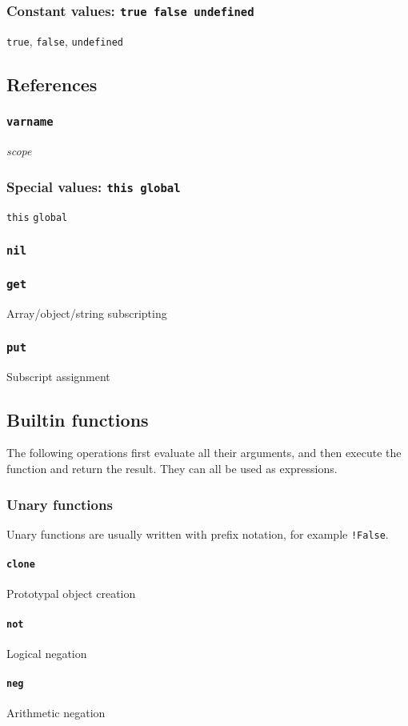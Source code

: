 \documentclass[10pt]{article}
\newcommand{\n}[1]{{\tt #1}}
\newcommand{\p}[1]{{\em #1}}
\begin{document}
\subsubsection{Constant values: \tt true false undefined}
\n{true}, \n{false}, \n{undefined}

\subsection{References}
\subsubsection{\tt varname}
\p{scope}
\subsubsection{Special values: \tt this global}
\n{this} \n{global}
\subsubsection{\tt nil}
\subsubsection{\tt get} 
Array/object/string subscripting
\subsubsection{\tt put} 
Subscript assignment

\subsection{Builtin functions}
The following operations first evaluate all their arguments, and then execute the function and return the result. They can all be used as expressions.
\subsubsection{Unary functions}
Unary functions are usually written with prefix notation, for example \verb|!False|.
\paragraph{\tt clone} Prototypal object creation
\paragraph{\tt not} Logical negation
\paragraph{\tt neg} Arithmetic negation
\end{document}

